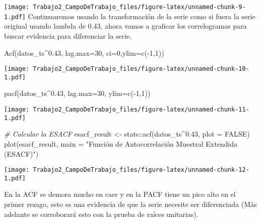 \documentclass[
]{article}
\newenvironment{Shaded}{\begin{snugshade}}{\end{snugshade}}
\newcommand{\AttributeTok}[1]{\textcolor[rgb]{0.77,0.63,0.00}{#1}}
\newcommand{\CommentTok}[1]{\textcolor[rgb]{0.56,0.35,0.01}{\textit{#1}}}
\newcommand{\ConstantTok}[1]{\textcolor[rgb]{0.00,0.00,0.00}{#1}}
\newcommand{\DecValTok}[1]{\textcolor[rgb]{0.00,0.00,0.81}{#1}}
\newcommand{\FloatTok}[1]{\textcolor[rgb]{0.00,0.00,0.81}{#1}}
\newcommand{\FunctionTok}[1]{\textcolor[rgb]{0.00,0.00,0.00}{#1}}
\newcommand{\NormalTok}[1]{#1}
\newcommand{\OtherTok}[1]{\textcolor[rgb]{0.56,0.35,0.01}{#1}}
\newcommand{\SpecialCharTok}[1]{\textcolor[rgb]{0.00,0.00,0.00}{#1}}
\newcommand{\StringTok}[1]{\textcolor[rgb]{0.31,0.60,0.02}{#1}}
\begin{document}
\texttt{[image: Trabajo2\_CampoDeTrabajo\_files/figure-latex/unnamed-chunk-9-1.pdf]}
Continuaremos usando la transformación de la serie como si fuera la
serie original usando lambda de 0.43, ahora vamos a graficar los
correlogramas para buscar evidencia para diferenciar la serie.

\begin{Shaded}
\begin{Highlighting}[]
\FunctionTok{Acf}\NormalTok{(datos\_ts}\SpecialCharTok{\^{}}\FloatTok{0.43}\NormalTok{, }\AttributeTok{lag.max=}\DecValTok{30}\NormalTok{, }\AttributeTok{ci=}\DecValTok{0}\NormalTok{,}\AttributeTok{ylim=}\FunctionTok{c}\NormalTok{(}\SpecialCharTok{{-}}\DecValTok{1}\NormalTok{,}\DecValTok{1}\NormalTok{))}
\end{Highlighting}
\end{Shaded}

\texttt{[image: Trabajo2\_CampoDeTrabajo\_files/figure-latex/unnamed-chunk-10-1.pdf]}

\begin{Shaded}
\begin{Highlighting}[]
\FunctionTok{pacf}\NormalTok{(datos\_ts}\SpecialCharTok{\^{}}\FloatTok{0.43}\NormalTok{, }\AttributeTok{lag.max=}\DecValTok{30}\NormalTok{, }\AttributeTok{ylim=}\FunctionTok{c}\NormalTok{(}\SpecialCharTok{{-}}\DecValTok{1}\NormalTok{,}\DecValTok{1}\NormalTok{))}
\end{Highlighting}
\end{Shaded}

\texttt{[image: Trabajo2\_CampoDeTrabajo\_files/figure-latex/unnamed-chunk-11-1.pdf]}

\begin{Shaded}
\begin{Highlighting}[]
\CommentTok{\# Calcular la ESACF}
\NormalTok{esacf\_result }\OtherTok{\textless{}{-}}\NormalTok{ stats}\SpecialCharTok{::}\FunctionTok{acf}\NormalTok{(datos\_ts}\SpecialCharTok{\^{}}\FloatTok{0.43}\NormalTok{, }\AttributeTok{plot =} \ConstantTok{FALSE}\NormalTok{)}
\FunctionTok{plot}\NormalTok{(esacf\_result, }\AttributeTok{main =} \StringTok{"Función de Autocorrelación Muestral Extendida (ESACF)"}\NormalTok{)}
\end{Highlighting}
\end{Shaded}

\texttt{[image: Trabajo2\_CampoDeTrabajo\_files/figure-latex/unnamed-chunk-12-1.pdf]}

En la ACF se demora mucho en caer y en la PACF tiene un pico alto en el
primer rezago, esto es una evidencia de que la serie necesite ser
diferenciada (Más adelante se corroborará esto con la prueba de raíces
unitarias).
\end{document}
